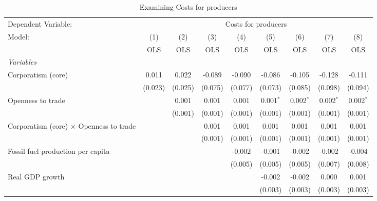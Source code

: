 
\begin{table}[htbp]
   \caption{Examining Costs for producers}
   \centering
   \begin{tabular}{lcccccccc}
      \toprule
      Dependent Variable: & \multicolumn{8}{c}{Costs for producers}\\
      Model:                                         & (1)     & (2)     & (3)     & (4)     & (5)         & (6)         & (7)         & (8)\\  
                                                     &  OLS    & OLS     & OLS     & OLS     & OLS         & OLS         & OLS         & OLS\\  
      \midrule
      \emph{Variables}\\
      Corporatism (core)                             & 0.011   & 0.022   & -0.089  & -0.090  & -0.086      & -0.105      & -0.128      & -0.111\\   
                                                     & (0.023) & (0.025) & (0.075) & (0.077) & (0.073)     & (0.085)     & (0.098)     & (0.094)\\   
      Openness to trade                              &         & 0.001   & 0.001   & 0.001   & 0.001$^{*}$ & 0.002$^{*}$ & 0.002$^{*}$ & 0.002$^{*}$\\   
                                                     &         & (0.001) & (0.001) & (0.001) & (0.001)     & (0.001)     & (0.001)     & (0.001)\\   
      Corporatism (core) $\times$ Openness to trade  &         &         & 0.001   & 0.001   & 0.001       & 0.001       & 0.001       & 0.001\\   
                                                     &         &         & (0.001) & (0.001) & (0.001)     & (0.001)     & (0.001)     & (0.001)\\   
      Fossil fuel production per capita              &         &         &         & -0.002  & -0.001      & -0.002      & -0.002      & -0.004\\   
                                                     &         &         &         & (0.005) & (0.005)     & (0.005)     & (0.007)     & (0.008)\\   
      Real GDP growth                                &         &         &         &         & -0.002      & -0.002      & 0.000       & 0.001\\   
                                                     &         &         &         &         & (0.003)     & (0.003)     & (0.003)     & (0.003)\\   

\end{tabular}
\end{table}
